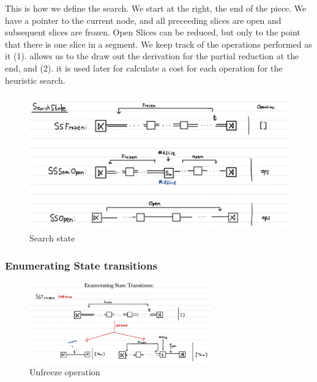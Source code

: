 \documentclass[12pt,a4paper,twoside,openright]{report}
\theoremstyle{definition}
\begin{document}
This is how we define the search. We start at the right, the end of the piece. We have a pointer to the current node, and all preceeding slices are open and subsequent slices are frozen. Open Slices can be reduced, but only to the point that there is one slice in a segment. We keep track of the operations performed as it (1). allows us to the draw out the derivation for the partial reduction at the end, and (2). it is used later for calculate a cost for each operation for the heuristic search.





\begin{figure}[ht]
  \centering
  \includegraphics[width=\textwidth]{searchstate}
  \caption{Search state}
  \label{fig:searchstate}
\end{figure}
\par
\par

\FloatBarrier
\subsubsection{Enumerating State transitions}

\begin{figure}[ht]
  \centering
  \includegraphics[width=0.7\textwidth]{frozenenum}
  \caption{Unfreeze operation}
  \label{fig:frozenenum}
\end{figure}
\end{document}

